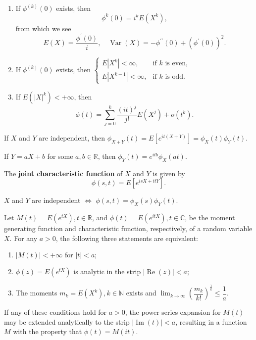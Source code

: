 \documentclass[11pt,singlecolumn, openany, citestyle=authoryear]{elegantbook}
\begin{document}
\begin{CJK}{UTF8}{gbsn}
\begin{theorem}
    \begin{enumerate}
        \item If $\phi^{(k)}(0)$ exists, then 
        $$
        \phi^k(0)=i^k E(X^k),
        $$
        from which we see 
        $$
        E(X)=\frac{\phi^\prime(0)}{i},\quad \operatorname{Var}(X)=
        -\phi^{\prime \prime}(0)+(\phi^\prime(0))^2.
        $$
        \item If $\phi^{(k)}(0)$ exists, then 
        $
        \begin{cases}
            E|X^k|< \infty, & \text{if } k \text{ is  even},\\
            E|X^{k-1}| < \infty, & \text{if } k \text{ is odd}.
        \end{cases}
        $
        \item If $E(|X|^k)<+\infty$, then 
        $$
        \phi(t)=\sum_{j=0}^k \frac{(it)^j}{j!} E(X^j)+o(t^k).
        $$
    \end{enumerate}
\end{theorem}

\begin{theorem}
    If $X$ and $Y$ are independent, then $\phi_{X+Y}(t)
    =E[e^{it(X+Y)}]=\phi_X(t)\phi_Y(t)$.
\end{theorem}
\begin{lemma}
    If $Y=aX+b$ for some $a,b\in\mathbb{R}$, then 
    $\phi_Y(t)=e^{itb}\phi_X(at)$.
\end{lemma}
\begin{definition}
    The \textbf{joint characteristic function} of $X$ and $Y$ is given by 
    $$
    \phi(s,t)=E[e^{isX+itY}].
    $$
\end{definition}
\begin{theorem}
    $X$ and $Y$ are independent $\iff$ $\phi(s,t)=\phi_X(s)\phi_Y(t)$.
\end{theorem}

\begin{theorem}
    Let $M(t) = E(e^{tX}), t \in \mathbb{R}$, and $\phi(t) = E(e^{itX}), t\in\mathbb{C}$, 
    be the moment generating function and characteristic function, respectively, 
    of a random variable $X$. For any $a > 0$, the following three statements are equivalent:
    \begin{enumerate}
        \item $|M(t)|<+\infty$ for $|t|<a$;
        \item $\phi(z)=E(e^{tX})$ is analytic in the strip $|\operatorname{Re}(z)|<a$;
        \item The moments $m_k=E(X^k), k\in\mathbb{N}$ exists and 
        $\displaystyle \lim_{k\to\infty}\left(
            \dfrac{m_k}{k!}
        \right)^{\frac{1}{k}}\leqslant \dfrac{1}{a}$. 
    \end{enumerate} 
    If any of these conditions hold for $a > 0$, the power series expansion for $M(t)$ may be
extended analytically to the strip $|\operatorname{Im}(t)| < a$, resulting in a function $M$ with the property that $\phi(t) = M(it)$.
\end{theorem}


\end{CJK}
\end{document}
